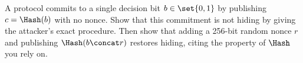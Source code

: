 \begin{exercise}
A protocol commits to a single decision bit $b \in \set{0,1}$ by publishing $c = \Hash(b)$ with no nonce. Show that this commitment is not hiding by giving the attacker's exact procedure. Then show that adding a 256-bit random nonce $r$ and publishing $\Hash(b \concat r)$ restores hiding, citing the property of $\Hash$ you rely on.
\end{exercise}
